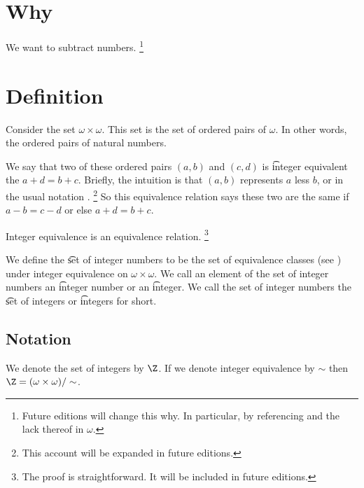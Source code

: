 
\section*{Why}

We want to subtract numbers.
  \ifhmode\unskip\fi\footnote{
Future editions will change this why. In particular, by referencing  and the lack thereof in $\omega $.
  }

\section*{Definition}

Consider the set $\omega  \times \omega $.
This set is the set of ordered pairs of $\omega $.
In other words, the ordered pairs of natural numbers.

We say that two of these ordered pairs $(a, b)$ and $(c, d)$ is \t{integer equivalent} the $a + d = b +c$.
Briefly, the intuition is that $(a, b)$ represents $a$ less $b$, or in the usual notation .
  \ifhmode\unskip\fi\footnote{
This account will be expanded in future editions.
  }
So this equivalence relation says these two are the same if $a - b = c - d$ or else $a + d = b + c$.

\begin{proposition}Integer equivalence is an equivalence relation.
\ifhmode\unskip\fi\footnote{
The proof is straightforward. It will be included in future editions.
}\end{proposition}
We define the \t{set of integer numbers} to be the set of equivalence classes (see ) under integer equivalence on $\omega  \times \omega $.
We call an element of the set of integer numbers an \t{integer number} or an \t{integer}.
We call the set of integer numbers the \t{set of integers} or \t{integers} for short.

\subsection*{Notation}

We denote the set of integers by $\Z $.
If we denote integer equivalence by $\sim$ then $\Z  = (\omega \times \omega )/\sim$.
